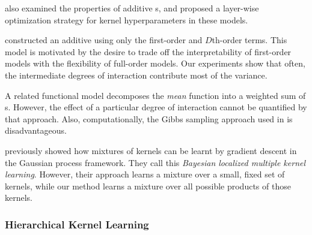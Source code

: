\citet{durrande2011additive} also examined the properties of additive \gp{}s, and proposed a layer-wise optimization strategy for kernel hyperparameters in these models.

\citet{plate1999accuracy} constructed an additive \gp{} using only the first-order and $D$th-order terms.
This model is motivated by the desire to trade off the interpretability of first-order models with the flexibility of full-order models.
Our experiments show that often, the intermediate degrees of interaction contribute most of the variance.

A related functional \ANOVA{} \gp{} model \citep{kaufman2010bayesian} decomposes the \emph{mean} function into a weighted sum of \gp{}s.
However, the effect of a particular degree of interaction cannot be quantified by that approach.
Also, computationally, the Gibbs sampling approach used in \citep{kaufman2010bayesian} is disadvantageous.

\citet{christoudias2009bayesian} previously showed how mixtures of kernels can be learnt by gradient descent in the Gaussian process framework.  They call this \emph{Bayesian localized multiple kernel learning}.
However, their approach learns a mixture over a small, fixed set of kernels, while our method learns a mixture over all possible products of those kernels.


\subsubsection{Hierarchical Kernel Learning}

